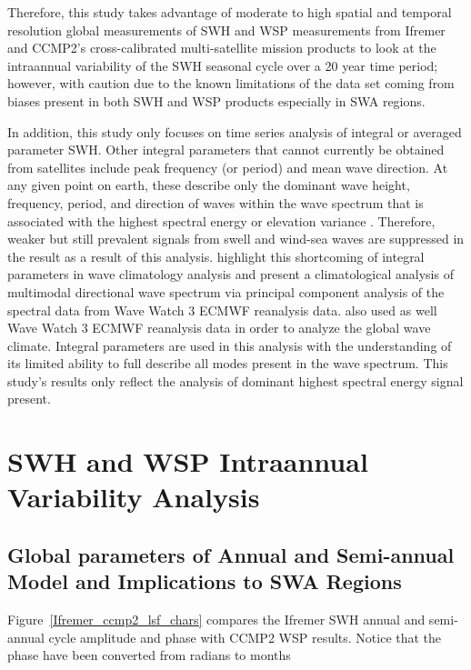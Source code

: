 \documentclass[12pt,twoside]{article}
\begin{document}
Therefore, this study takes advantage of moderate to high spatial and temporal resolution global measurements of SWH and WSP measurements from Ifremer and CCMP2's cross-calibrated multi-satellite mission products to look at the intraannual variability of the SWH seasonal cycle over a 20 year time period; however, with caution due to the known limitations of the data set coming from biases present in both SWH and WSP products especially in SWA regions.


In addition, this study only focuses on time series analysis of integral or averaged parameter SWH. Other integral parameters that cannot currently be obtained from satellites include peak frequency (or period) and mean wave direction. At any given point on earth, these describe only the dominant wave height, frequency, period, and direction of waves within the wave spectrum that is associated with the highest spectral energy or elevation variance \cite{ardhuin2015ocean}. Therefore, weaker but still prevalent signals from swell and wind-sea waves are suppressed in the result as a result of this analysis. \citet{echevarria2019seasonal} highlight this shortcoming of integral parameters in wave climatology analysis and present a climatological analysis of multimodal directional wave spectrum via principal component analysis of the spectral data from Wave Watch 3 ECMWF reanalysis data. \citet{semedo2011global} also used as well Wave Watch 3 ECMWF reanalysis data in order to analyze the global wave climate. Integral parameters are used in this analysis with the understanding of its limited ability to full describe all modes present in the wave spectrum. This study's results only reflect the analysis of dominant highest spectral energy signal present.

\section{SWH and WSP Intraannual Variability Analysis}

\subsection{Global parameters of Annual and Semi-annual Model and Implications to SWA Regions}

Figure~\ref{Ifremer_ccmp2_lsf_chars} compares the Ifremer SWH annual and semi-annual cycle amplitude and phase with CCMP2 WSP results. Notice that the phase have been converted from radians to months 
\end{document}
